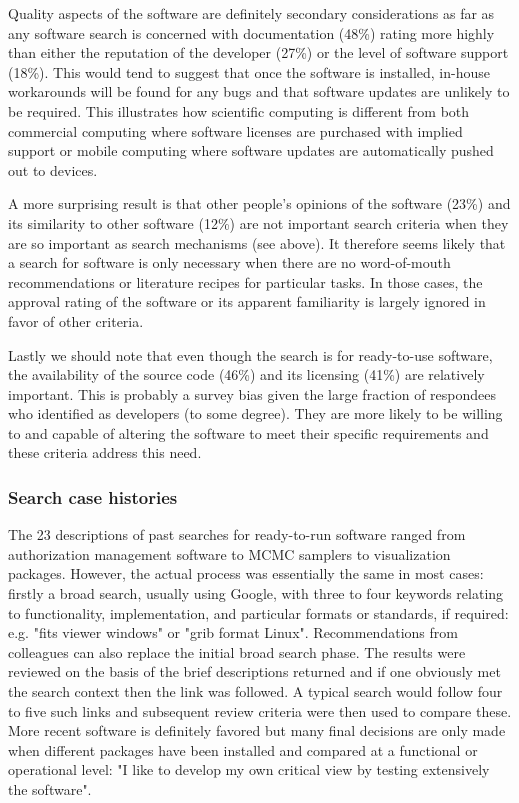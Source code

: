\documentclass{casicswhitepaper}
\begin{document}
Quality aspects of the software are definitely secondary considerations as far as any software search is concerned with documentation (48\%) rating more highly than either the reputation of the developer (27\%) or the level of software support (18\%). This would tend to suggest that once the software is installed, in-house workarounds will be found for any bugs and that software updates are unlikely to be required. This illustrates how scientific computing is different from both commercial computing where software licenses are purchased with implied support or mobile computing where software updates are automatically pushed out to devices. 

A more surprising result is that other people's opinions of the software (23\%) and its similarity to other software (12\%) are not important search criteria when they are so important as search mechanisms (see above). It therefore seems likely that a search for software is only necessary when there are no word-of-mouth recommendations or literature recipes for particular tasks. In those cases, the approval rating of the software or its apparent familiarity is largely ignored in favor of other criteria.

Lastly we should note that even though the search is for ready-to-use software, the availability of the source code (46\%) and its licensing (41\%) are relatively important. This is probably a survey bias given the large fraction of respondees who identified as developers (to some degree). They are more likely to be willing to and capable of altering the software to meet their specific requirements and these criteria address this need.

\subsubsection{Search case histories}

The 23 descriptions of past searches for ready-to-run software ranged from authorization management software to MCMC samplers to visualization packages. However, the actual process was essentially the same in most cases: firstly a broad search, usually using Google, with three to four keywords relating to functionality, implementation, and particular formats or standards, if required: e.g. "fits viewer windows" or "grib format Linux". Recommendations from colleagues can also replace the initial broad search phase. The results were reviewed on the basis of the brief descriptions returned and if one obviously met the search context then the link was followed. A typical search would follow four to five such links and subsequent review criteria were then used to compare these. More recent software is definitely favored but many final decisions are only made when different packages have been installed and compared at a functional or operational level: "I like to develop my own critical view by testing extensively the software".
\end{document}
